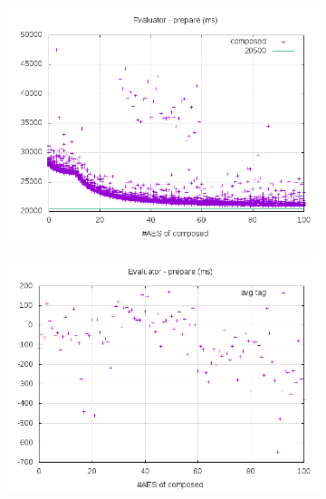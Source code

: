 \documentclass[10pt,a4paper]{article}
\begin{document}
\begin{figure}[h]
    \begin{subfigure}[t]{0.3\textwidth}
        \includegraphics[width=\textwidth]{eval_prepare_plots}
        \caption{}
        \label{data eval prepare composed}
    \end{subfigure}
    \begin{subfigure}[t]{0.3\textwidth}
        \includegraphics[width=\textwidth]{eval_prepare_avg}
        \caption{}
        \label{data eval prepare tag}
    \end{subfigure}
    \begin{subfigure}[t]{0.3\textwidth}

\end{subfigure}
\end{figure}
\end{document}
